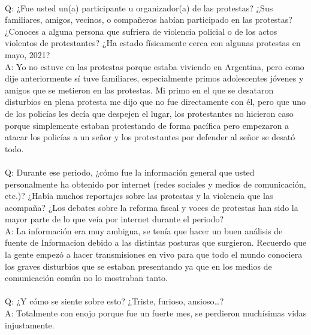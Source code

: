 \documentclass{phyasgn}\usepackage{nag}
\begin{document}
\\
Q: ¿Fue usted un(a) participante u organizador(a) de las protestas? ¿Sus familiares, amigos, vecinos, o compañeros habían participado en las protestas? ¿Conoces a alguna persona que sufriera de violencia policial o de los actos violentos de protestantes? ¿Ha estado físicamente cerca con algunas protestas en mayo, 2021?\\
A: Yo no estuve en las protestas porque estaba viviendo en Argentina, pero como dije anteriormente sí tuve familiares, especialmente primos adolescentes jóvenes y amigos que se metieron en las protestas. Mi primo en el que se desataron disturbios en plena protesta me dijo que no fue directamente con él, pero que uno de los policías les decía que despejen el lugar, los protestantes no hicieron caso porque simplemente estaban protestando de forma pacífica pero empezaron a atacar los policías a un señor y los protestantes por defender al señor se desató todo.\\
\\
Q: Durante ese periodo, ¿cómo fue la información general que usted personalmente ha obtenido por internet (redes sociales y medios de comunicación, etc.)? ¿Había muchos reportajes sobre las protestas y la violencia que las acompaña? ¿Los debates sobre la reforma fiscal y voces de protestas han sido la mayor parte de lo que veía por internet durante el periodo?\\
A: La información era muy ambigua, se tenía que hacer un buen análisis de fuente de Informacion debido a las distintas posturas que surgieron. Recuerdo que la gente empezó a hacer transmisiones en vivo para que todo el mundo conociera los graves disturbios que se estaban presentando ya que en los medios de comunicación común no lo mostraban tanto. \\
\\
Q: ¿Y cómo se siente sobre esto? ¿Triste, furioso, ansioso…? \\
A: Totalmente con enojo porque fue un fuerte mes, se perdieron muchísimas vidas injustamente.\\
\end{document}

